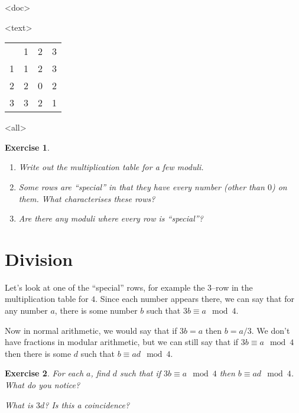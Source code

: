 \documentclass[
  html5,
  mathml,
  use filename
]{internet}
\newtheorem{exercise}{Exercise}
\begin{document}
\begin{center}
\imode<doc>
\imode
<text>
\begin{tabular}{cccc}
    &  1 & 2 & 3 \\
  1 &  1 & 2 & 3 \\
  2 &  2 & 0 & 2 \\
  3 &  3 & 2 & 1 \\
\end{tabular}
\imode
<all>
\end{center}

\begin{exercise}
\begin{enumerate}
\item Write out the multiplication table for a few moduli.
\item Some rows are ``special'' in that they have every number (other than \(0\)) on them.
What characterises these rows?
\item Are there any moduli where every row is ``special''?
\end{enumerate}
\end{exercise}

\section{Division}

Let's look at one of the ``special'' rows, for example the \(3\)--row in the multiplication table for \(4\).
Since each number appears there, we can say that for any number \(a\), there is some number \(b\) such that \(3 b \equiv a \mod 4\).

Now in normal arithmetic, we would say that if \(3 b = a\) then \(b = a/3\).
We don't have fractions in modular arithmetic, but we can still say that if \(3 b \equiv a \mod 4\) then there is some \(d\) such that \(b \equiv a d \mod 4\).

\begin{exercise}
For each \(a\), find \(d\) such that if \(3 b \equiv a \mod 4\) then \(b \equiv a d \mod 4\).
What do you notice?

What is \(3 d\)?
Is this a coincidence?
\end{exercise}
\end{document}
